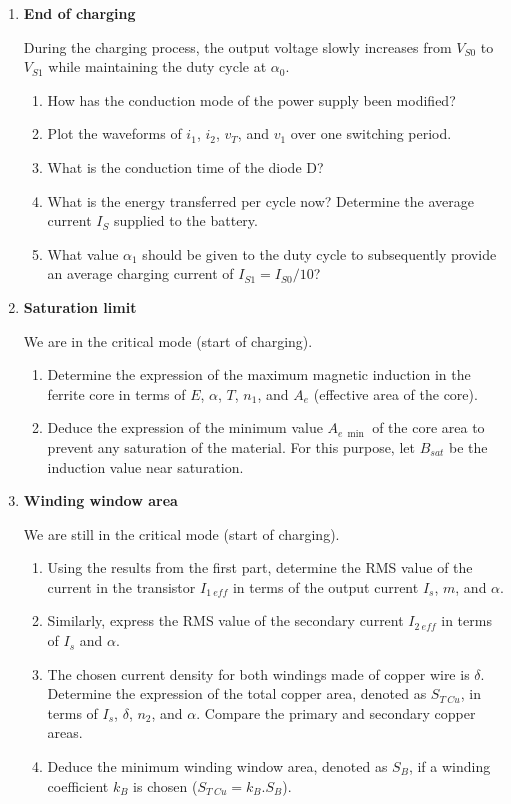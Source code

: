 \begin{enumerate}
\item \textbf{End of charging}

During the charging process, the output voltage slowly increases from $V_{S0}$ to $V_{S1}$ while maintaining the duty cycle at $\alpha_0$.
\begin{enumerate}
\item How has the conduction mode of the power supply been modified?
\item Plot the waveforms of $i_1$, $i_2$, $v_T$, and $v_1$ over one switching period.
\item What is the conduction time of the diode D\@?
\item What is the energy transferred per cycle now? Determine the average current $I_S$ supplied to the battery.
\item What value $\alpha_1$ should be given to the duty cycle to subsequently provide an average charging current of $I_{S1} = I_{S0}/10$?
\end{enumerate}

\item \textbf{Saturation limit}

We are in the critical mode (start of charging).

\begin{enumerate}
\item Determine the expression of the maximum magnetic induction in the ferrite core in terms of $E$, $\alpha$, $T$, $n_1$, and $A_e$ (effective area of the core).
\item Deduce the expression of the minimum value $A_{e\ \min}$ of the core area to prevent any saturation of the material. For this purpose, let $B_{sat}$ be the induction value near saturation.
\end{enumerate}

\item \textbf{Winding window area}

We are still in the critical mode (start of charging).

\begin{enumerate}
\item Using the results from the first part, determine the RMS value of the current in the transistor $I_{1\ eff}$ in terms of the output current $I_s$, $m$, and $\alpha$.
\item Similarly, express the RMS value  of the secondary current $I_{2\ eff}$ in terms of $I_s$ and $\alpha$.
\item The chosen current density for both windings made of copper wire is $\delta$. Determine the expression of the total copper area, denoted as $S_{T\ Cu}$, in terms of $I_s$, $\delta$, $n_2$, and $\alpha$. Compare the primary and secondary copper areas.
\item Deduce the minimum winding window area, denoted as $S_B$, if a winding coefficient $k_B$ is chosen ($S_{T\ Cu} = k_B.S_B$).
\end{enumerate}


\end{enumerate}
